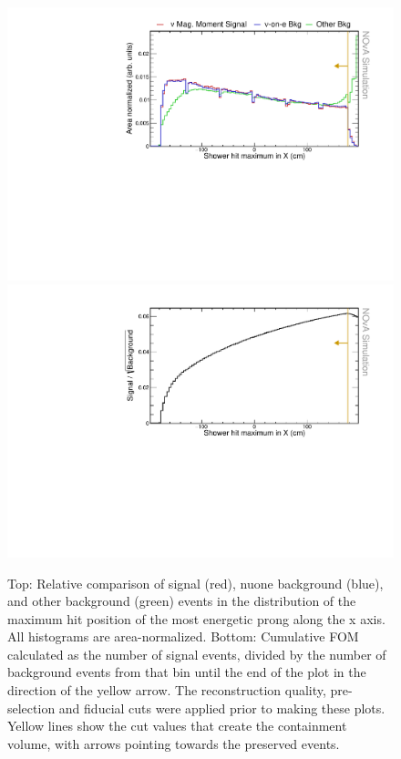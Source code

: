 \begin{figure}[hbtp]
\centering
\includegraphics[width=.9\textwidth]{Plots/NuMMEventSelection/N1Cut_maxX.pdf}
\includegraphics[width=.9\textwidth]{Plots/NuMMEventSelection/NuMM_N1Cut_maxXleft_FOMStats}
\caption[Hit maximum x containment cut]{Top: Relative comparison of signal (red), \acrshort{nuone} background (blue), and other background (green) events in the distribution of the maximum hit position of the most energetic prong along the x axis. All histograms are area-normalized. Bottom: Cumulative \acrshort{FOM} calculated as the number of signal events, divided by the number of background events from that bin until the end of the plot in the direction of the yellow arrow. The reconstruction quality, pre-selection and fiducial cuts were applied prior to making these plots. Yellow lines show the cut values that create the containment volume, with arrows pointing towards the preserved events.}
\label{fig:NuMMContainmentCutMaxX}
\end{figure}

